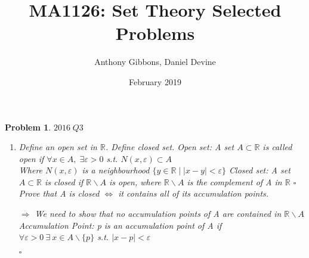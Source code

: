 \documentclass[a4paper]{article}
\title{MA1126: Set Theory
 Selected Problems}
\author{Anthony Gibbons, Daniel Devine}
\date{February 2019}
\newtheorem{prob}{\large{\large{Problem}}}
\newenvironment{sol}{\noindent{\large{\bf Solution:}}}{\hfill\ensuremath{\square}}
\def\bR{\mathbb R}
\def\nl{\newline}
\def\bs{\backslash}
\begin{document}
\maketitle

\begin{prob} %
\large{ $2016\; Q3$
\begin{enumerate}[(a.)]
\item Define an open set in $\bR$. Define closed set. 
     \nl\begin{sol}
\large{ 
Open set:
\nl A set $A \subset \bR$ is called open if $\forall x\in A,\; \exists \varepsilon>0$ s.t. $N(x,\varepsilon)\subset A$ \\
Where $N(x,\varepsilon)$ is a neighbourhood $\{y\in \bR\;|\; |x-y|<\varepsilon\}$
\nl Closed set:
\nl A set $A\subset \bR$ is closed if $\bR\bs A$ is open, where $\bR\bs A$ is the complement of A in $\bR$
}
\end{sol}
\nl Prove that A is closed $\iff$ it contains all of its accumulation points.
\nl\begin{sol}
\large{\nl$\Rightarrow$
\nl We need to show that no accumulation points of A are contained in $\bR\bs A$ \\
Accumulation Point: p is an accumulation point of A if \\
$\forall \varepsilon>0 \ \exists \ x\in A\bs\{p\}$ s.t. $|x-p|<\varepsilon$ 

\begin{center}
\end{center}}
\end{sol}
\end{enumerate}}
\end{prob}
\end{document}
